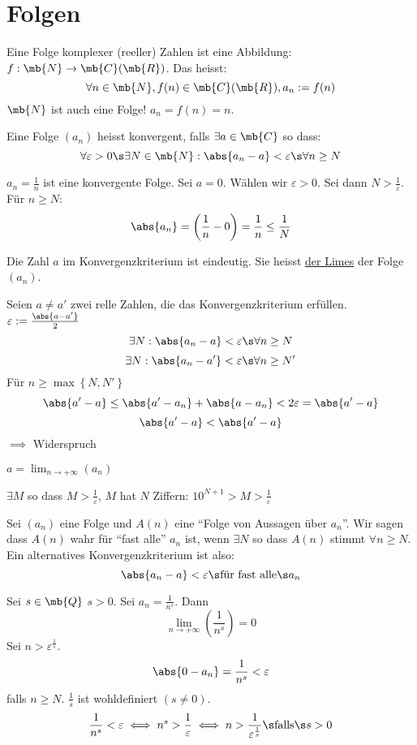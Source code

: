 \section{Folgen}
\begin{Def}
  Eine Folge komplexer (reeller) Zahlen ist eine Abbildung: $f:\mb{N}\to\mb{C}(\mb{R})$. Das heisst:
  \[\forall n\in\mb{N}, f(n)\in\mb{C}(\mb{R}), a_n:=f(n)\]
  $\mb{N}$ ist auch eine Folge! $a_n=f(n)=n$.
\end{Def}
\begin{Def}
  Eine Folge $(a_n)$ heisst konvergent, falls $\exists a\in\mb{C}$ so dass:
  \[\forall\varepsilon>0\s\exists N\in\mb{N}:\abs{a_n-a}<\varepsilon\s\forall n\geq N\]
\end{Def}
\begin{Bsp}
  $a_n=\frac{1}{n}$ ist eine konvergente Folge. Sei $a=0$. Wählen wir $\varepsilon>0$. Sei dann $N>\frac{1}{\varepsilon}$. Für $n\geq N$:
  \[\abs{a_n}=\left( \frac{1}{n}-0 \right)=\frac{1}{n}\leq\frac{1}{N}\]
\end{Bsp}
\begin{Bem}
  Die Zahl $a$ im Konvergenzkriterium ist eindeutig. Sie heisst \ul{der Limes} der Folge $(a_n)$.
\end{Bem}
\begin{Bew}
  Seien $a\neq a'$ zwei relle Zahlen, die das Konvergenzkriterium erfüllen. $\varepsilon:=\frac{\abs{a-a'}}{2}$
  \[\exists N:\abs{a_n-a}<\varepsilon\s\forall n\geq N\]
  \[\exists N:\abs{a_n-a'}<\varepsilon\s\forall n\geq N'\]
  Für $n\geq \max \left\{ N,N' \right\}$
  \[\abs{a'-a}\leq\abs{a'-a_n}+\abs{a-a_n}<2\varepsilon=\abs{a'-a}\]
  \[\abs{a'-a}<\abs{a'-a}\]
  $\implies$ Widerspruch
\end{Bew}
\begin{Bem}
  $a=\lim_{n\to+\infty}(a_n)$
\end{Bem}
\begin{Bem}
  $\exists M$ so dass $M>\frac{1}{\varepsilon}$, $M$ hat $N$ Ziffern: $10^{N+1}>M>\frac{1}{\varepsilon}$
\end{Bem}
\begin{Def}
  Sei $(a_n)$ eine Folge und $A(n)$ eine ``Folge von Aussagen über $a_n$''. Wir sagen dass $A(n)$ wahr für ``fast alle'' $a_n$ ist, wenn $\exists N$ so dass $A(n)$ stimmt $\forall n\geq N$. Ein alternatives Konvergenzkriterium ist also:
  \[\abs{a_n-a}<\varepsilon\s\text{für fast alle}\s a_n\]
\end{Def}
\begin{Bsp}
  Sei $s\in\mb{Q}$ $s>0$. Sei $a_n=\frac{1}{n^s}$. Dann
  \[\lim_{n\to+\infty}\left( \frac{1}{n^s} \right)=0\]
  Sei $n>\varepsilon^{\frac{1}{s}}$.
  \[\abs{0-a_n}=\frac{1}{n^s}<\varepsilon\]
  falls $n\geq N$. $\frac{1}{s}$ ist wohldefiniert $(s\neq 0)$.
  \[\frac{1}{n^s}<\varepsilon \iff n^s>\frac{1}{\varepsilon}\iff n>\frac{1}{\varepsilon^{\frac{1}{s}}}\s\text{falls}\s s>0\]
\end{Bsp}
